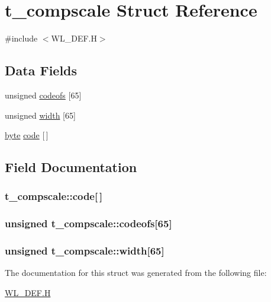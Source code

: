 \hypertarget{structt__compscale}{
\section{t\_\-compscale Struct Reference}
\label{structt__compscale}
}


{\ttfamily \#include $<$WL\_\-DEF.H$>$}

\subsection*{Data Fields}
\begin{DoxyCompactItemize}
\item 
unsigned \hyperlink{structt__compscale_a689fbe299d97cea79d1bcf354087fe34}{codeofs} \mbox{[}65\mbox{]}
\item 
unsigned \hyperlink{structt__compscale_a502882656a19323aaf77b1e3fc0f2de4}{width} \mbox{[}65\mbox{]}
\item 
\hyperlink{ID__HEAD_8H_a0c8186d9b9b7880309c27230bbb5e69d}{byte} \hyperlink{structt__compscale_ad9b8e81caf4afec2d560e69c0f58e26b}{code} \mbox{[}$\,$\mbox{]}
\end{DoxyCompactItemize}


\subsection{Field Documentation}
\hypertarget{structt__compscale_ad9b8e81caf4afec2d560e69c0f58e26b}{
\subsubsection[{code}]{ {\bf t\_\-compscale::code}\mbox{[}$\,$\mbox{]}}}
\label{structt__compscale_ad9b8e81caf4afec2d560e69c0f58e26b}
\hypertarget{structt__compscale_a689fbe299d97cea79d1bcf354087fe34}{
\subsubsection[{codeofs}]{\setlength{\rightskip}{0pt plus 5cm}unsigned {\bf t\_\-compscale::codeofs}\mbox{[}65\mbox{]}}}
\label{structt__compscale_a689fbe299d97cea79d1bcf354087fe34}
\hypertarget{structt__compscale_a502882656a19323aaf77b1e3fc0f2de4}{
\subsubsection[{width}]{\setlength{\rightskip}{0pt plus 5cm}unsigned {\bf t\_\-compscale::width}\mbox{[}65\mbox{]}}}
\label{structt__compscale_a502882656a19323aaf77b1e3fc0f2de4}


The documentation for this struct was generated from the following file:\begin{DoxyCompactItemize}
\item 
\hyperlink{WL__DEF_8H}{WL\_\-DEF.H}\end{DoxyCompactItemize}
